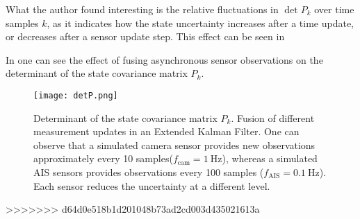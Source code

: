 What the author found interesting is the relative fluctuations in $\det{P_k}$ over time samples $k$, as it indicates how the state uncertainty increases after a time update, or decreases after a sensor update step. This effect can be seen in 

In  one can see the effect of fusing asynchronous sensor observations on the determinant of the state covariance matrix $P_k$.

\begin{figure}
	\centering
	\texttt{[image: detP.png]}
	\caption{Determinant of the state covariance matrix $P_k$. Fusion of different measurement updates in an Extended Kalman Filter. One can observe that a simulated camera sensor provides new observations approximately every 10 samples($f_{\text{cam}} = \SI{1}{\Hz}$), whereas a simulated AIS sensors provides observations every 100 samples ($f_{\text{AIS}} = \SI{0.1}{\Hz}$). Each sensor reduces the uncertainty at a different level.}
	\label{fig:detp}
\end{figure}
>>>>>>> d64d0e518b1d201048b73ad2cd003d435021613a
